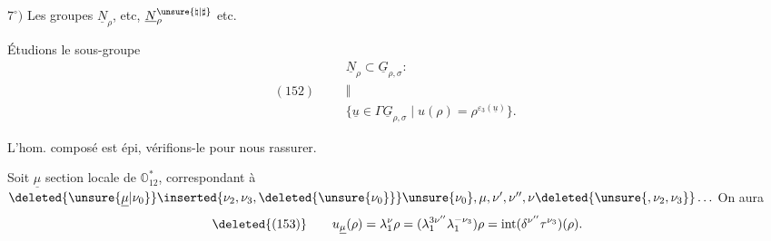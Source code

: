 
$7^\circ)$ Les groupes $\underline N_\rho$,  etc, $\underline N_\rho^{\unsure{\natural|\sharp}}$ etc.

Étudions le sous-groupe
\[
(152)\qquad
\begin{gathered}
\underline N_\rho\subset\underline G_{\rho,\sigma}:\\[-2pt]
\Vert\\[-2pt]
\{\underline u\in\Gamma\underline G_{\rho,\sigma}\mid u(\rho)=\rho^{\varepsilon_3(\underline u)}\}.
\end{gathered}
\]

 L'hom. composé
est épi,  vérifions-le pour nous rassurer.

Soit $\underline\mu$ section locale de $\mathbb O_{12}^{*}$, correspondant à
$\deleted{\unsure{\underline\mu|\nu_0}}\inserted{\nu_2,\nu_3,\deleted{\unsure{\nu_0}}}\unsure{\nu_0},\mu,\nu',\nu'',\nu\deleted{\unsure{,\nu_2,\nu_3}}\ldots$
On aura
\[
\deleted{(153)}\qquad
u_{\underline\mu}(\rho)=\lambda_1^\nu\rho
=(\lambda_1^{3\nu''}\lambda_1^{-\nu_3})\rho
=\operatorname{int}(\delta^{\nu''}\tau^{\nu_3})(\rho).
\]

